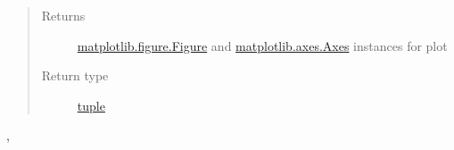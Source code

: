 \documentclass[letterpaper,10pt,english]{sphinxhowto}
\begin{document}
\begin{fulllineitems}
\begin{quote}
\begin{description}
\item[{Returns}] \leavevmode
\href{http://matplotlib.org/api/figure\_api.html\#matplotlib.figure.Figure}{matplotlib.figure.Figure}
and
\href{http://matplotlib.org/api/axes\_api.html\#matplotlib.axes.Axes}{matplotlib.axes.Axes}
instances for plot

\item[{Return type}] \leavevmode
\href{https://docs.python.org/library/functions.html\#tuple}{tuple}

\end{description}\end{quote}




{\hyperref[swtools_doc:swtools.plot_twinx]{\emph{}}}, {\hyperref[swtools_doc:swtools.plot_align]{\emph{}}}



\end{fulllineitems}

\end{document}
